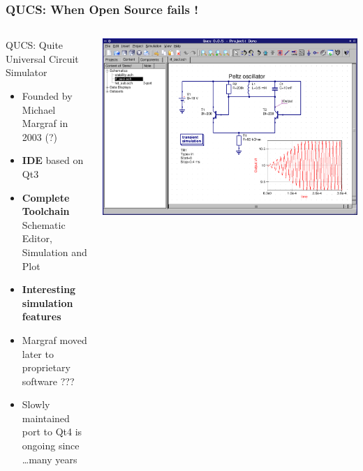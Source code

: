 \begin{frame}
  \frametitle{QUCS: When Open Source fails !}
  \begin{columns}
    \begin{column}{.6\textwidth}
      \centerline{QUCS: Quite Universal Circuit Simulator}
      \begin{itemize}
      \item Founded by Michael Margraf in 2003 (?)
      \item \textbf{IDE} based on Qt3 \\
      \item \textbf{Complete Toolchain} \\
        Schematic Editor, Simulation and Plot
      \item \textbf{Interesting simulation features}
      \item Margraf moved later to proprietary software ???
      \item Slowly maintained \\
        port to Qt4 is ongoing since \ldots many years
      \end{itemize}
    \end{column}
    \begin{column}{.4\textwidth}
      \begin{center}
        \includegraphics[width=1.\textwidth]{images/qucs.png}
      \end{center}
    \end{column}
  \end{columns}
\end{frame}

